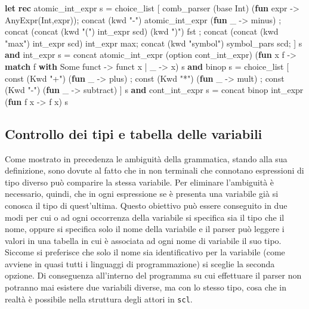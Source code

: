 \documentclass[]{article}
\newenvironment{Shaded}{}{}
\newcommand{\DataTypeTok}[1]{\textcolor[rgb]{0.56,0.13,0.00}{#1}}
\newcommand{\KeywordTok}[1]{\textcolor[rgb]{0.00,0.44,0.13}{\textbf{#1}}}
\newcommand{\NormalTok}[1]{#1}
\newcommand{\StringTok}[1]{\textcolor[rgb]{0.25,0.44,0.63}{#1}}
\begin{document}
\begin{Shaded}
\begin{Highlighting}[]
\KeywordTok{let} \KeywordTok{rec}\NormalTok{ atomic_int_expr s =}
\NormalTok{ choice_list [}
\NormalTok{   comb_parser (base Int) (}\KeywordTok{fun}\NormalTok{ expr -> AnyExpr(Int,expr));}
\NormalTok{   concat (kwd }\StringTok{"-"}\NormalTok{) atomic_int_expr (}\KeywordTok{fun}\NormalTok{ _ -> minus) ;}
\NormalTok{   concat (concat (kwd }\StringTok{"("}\NormalTok{) int_expr scd) (kwd }\StringTok{")"}\NormalTok{) }\DataTypeTok{fst}\NormalTok{ ;}
\NormalTok{   concat (concat (kwd }\StringTok{"max"}\NormalTok{) int_expr scd) int_expr }\DataTypeTok{max}\NormalTok{;}
\NormalTok{   concat (kwd }\StringTok{"symbol"}\NormalTok{) symbol_pars scd;}
\NormalTok{ ] s}
\KeywordTok{and}\NormalTok{ int_expr s =}
\NormalTok{ concat atomic_int_expr (}\DataTypeTok{option}\NormalTok{ cont_int_expr)}
\NormalTok{ (}\KeywordTok{fun}\NormalTok{ x f -> }\KeywordTok{match}\NormalTok{ f }\KeywordTok{with} \DataTypeTok{Some}\NormalTok{ funct -> funct x | _ -> x) s}
\KeywordTok{and}\NormalTok{ binop s =}
\NormalTok{ choice_list [}
\NormalTok{  const (Kwd }\StringTok{"+"}\NormalTok{) (}\KeywordTok{fun}\NormalTok{ _ -> plus) ;}
\NormalTok{  const (Kwd }\StringTok{"*"}\NormalTok{) (}\KeywordTok{fun}\NormalTok{ _ -> mult) ;}
\NormalTok{  const (Kwd }\StringTok{"-"}\NormalTok{) (}\KeywordTok{fun}\NormalTok{ _ -> subtract)}
\NormalTok{ ] s}
\KeywordTok{and}\NormalTok{ cont_int_expr s = concat binop int_expr (}\KeywordTok{fun}\NormalTok{ f x -> f x) s}
\end{Highlighting}
\end{Shaded}

\hypertarget{controllo-dei-tipi-e-tabella-delle-variabili}{%
\subsection{Controllo dei tipi e tabella delle
variabili}\label{controllo-dei-tipi-e-tabella-delle-variabili}}

Come mostrato in precedenza le ambiguità della grammatica, stando alla
sua definizione, sono dovute al fatto che in non terminali che connotano
espressioni di tipo diverso può comparire la stessa variabile. Per
eliminare l'ambiguità è necessario, quindi, che in ogni espressione se è
presenta una variabile già si conosca il tipo di quest'ultima. Questo
obiettivo può essere conseguito in due modi per cui o ad ogni occorrenza
della variabile si specifica sia il tipo che il nome, oppure si
specifica solo il nome della variabile e il parser può leggere i valori
in una tabella in cui è associata ad ogni nome di variabile il suo tipo.
Siccome si preferisce che solo il nome sia identificativo per la
variabile (come avviene in quasi tutti i linguaggi di programmazione) si
sceglie la seconda opzione. Di conseguenza all'interno del programma su
cui effettuare il parser non potranno mai esistere due variabili
diverse, ma con lo stesso tipo, cosa che in realtà è possibile nella
struttura degli attori in \texttt{scl}.
\end{document}
